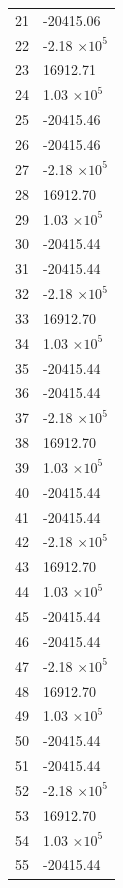\documentclass[a4paper,11pt]{article}
\begin{document}
\begin{center}
\begin{longtable}{|R{1.5cm}|R{2.6cm}|}
   21 &    -20415.06 \\
   22 &        -2.18 $\times 10^{           5}$ \\
   23 &     16912.71 \\
   24 &         1.03 $\times 10^{           5}$ \\
   25 &    -20415.46 \\
   26 &    -20415.46 \\
   27 &        -2.18 $\times 10^{           5}$ \\
   28 &     16912.70 \\
   29 &         1.03 $\times 10^{           5}$ \\
   30 &    -20415.44 \\
   31 &    -20415.44 \\
   32 &        -2.18 $\times 10^{           5}$ \\
   33 &     16912.70 \\
   34 &         1.03 $\times 10^{           5}$ \\
   35 &    -20415.44 \\
   36 &    -20415.44 \\
   37 &        -2.18 $\times 10^{           5}$ \\
   38 &     16912.70 \\
   39 &         1.03 $\times 10^{           5}$ \\
   40 &    -20415.44 \\
   41 &    -20415.44 \\
   42 &        -2.18 $\times 10^{           5}$ \\
   43 &     16912.70 \\
   44 &         1.03 $\times 10^{           5}$ \\
   45 &    -20415.44 \\
   46 &    -20415.44 \\
   47 &        -2.18 $\times 10^{           5}$ \\
   48 &     16912.70 \\
   49 &         1.03 $\times 10^{           5}$ \\
   50 &    -20415.44 \\
   51 &    -20415.44 \\
   52 &        -2.18 $\times 10^{           5}$ \\
   53 &     16912.70 \\
   54 &         1.03 $\times 10^{           5}$ \\
   55 &    -20415.44 \\

\end{longtable}
\end{center}
\end{document}
